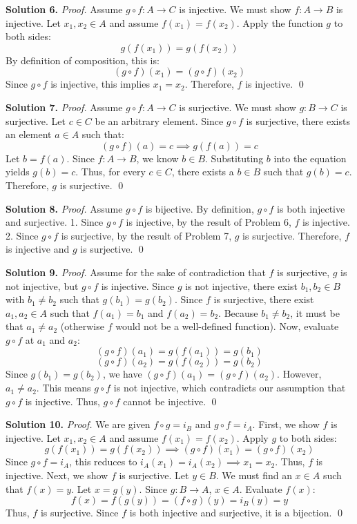 \documentclass[11pt, letterpaper]{article}
\theoremstyle{definition}
\theoremstyle{remark}
\begin{document}
\textbf{Solution 6.}
\textit{Proof.} Assume $g \circ f: A \to C$ is injective. We must show $f: A \to B$ is injective. Let $x_1, x_2 \in A$ and assume $f(x_1) = f(x_2)$. 
Apply the function $g$ to both sides:
\[
g(f(x_1)) = g(f(x_2))
\]
By definition of composition, this is:
\[
(g \circ f)(x_1) = (g \circ f)(x_2)
\]
Since $g \circ f$ is injective, this implies $x_1 = x_2$. Therefore, $f$ is injective.
\qed

\textbf{Solution 7.}
\textit{Proof.} Assume $g \circ f: A \to C$ is surjective. We must show $g: B \to C$ is surjective. Let $c \in C$ be an arbitrary element. 
Since $g \circ f$ is surjective, there exists an element $a \in A$ such that:
\[
(g \circ f)(a) = c \implies g(f(a)) = c
\]
Let $b = f(a)$. Since $f: A \to B$, we know $b \in B$. Substituting $b$ into the equation yields $g(b) = c$. 
Thus, for every $c \in C$, there exists a $b \in B$ such that $g(b) = c$. Therefore, $g$ is surjective.
\qed

\textbf{Solution 8.}
\textit{Proof.} Assume $g \circ f$ is bijective. By definition, $g \circ f$ is both injective and surjective.
1. Since $g \circ f$ is injective, by the result of Problem 6, $f$ is injective.
2. Since $g \circ f$ is surjective, by the result of Problem 7, $g$ is surjective.
Therefore, $f$ is injective and $g$ is surjective.
\qed

\textbf{Solution 9.}
\textit{Proof.} Assume for the sake of contradiction that $f$ is surjective, $g$ is not injective, but $g \circ f$ is injective.
Since $g$ is not injective, there exist $b_1, b_2 \in B$ with $b_1 \neq b_2$ such that $g(b_1) = g(b_2)$.
Since $f$ is surjective, there exist $a_1, a_2 \in A$ such that $f(a_1) = b_1$ and $f(a_2) = b_2$. 
Because $b_1 \neq b_2$, it must be that $a_1 \neq a_2$ (otherwise $f$ would not be a well-defined function).
Now, evaluate $g \circ f$ at $a_1$ and $a_2$:
\[
(g \circ f)(a_1) = g(f(a_1)) = g(b_1)
\]
\[
(g \circ f)(a_2) = g(f(a_2)) = g(b_2)
\]
Since $g(b_1) = g(b_2)$, we have $(g \circ f)(a_1) = (g \circ f)(a_2)$. 
However, $a_1 \neq a_2$. This means $g \circ f$ is not injective, which contradicts our assumption that $g \circ f$ is injective. Thus, $g \circ f$ cannot be injective.
\qed

\textbf{Solution 10.}
\textit{Proof.} We are given $f \circ g = i_B$ and $g \circ f = i_A$.
First, we show $f$ is injective. Let $x_1, x_2 \in A$ and assume $f(x_1) = f(x_2)$. Apply $g$ to both sides:
\[
g(f(x_1)) = g(f(x_2)) \implies (g \circ f)(x_1) = (g \circ f)(x_2)
\]
Since $g \circ f = i_A$, this reduces to $i_A(x_1) = i_A(x_2) \implies x_1 = x_2$. Thus, $f$ is injective.
Next, we show $f$ is surjective. Let $y \in B$. We must find an $x \in A$ such that $f(x) = y$. Let $x = g(y)$. Since $g: B \to A$, $x \in A$. Evaluate $f(x)$:
\[
f(x) = f(g(y)) = (f \circ g)(y) = i_B(y) = y
\]
Thus, $f$ is surjective. Since $f$ is both injective and surjective, it is a bijection.
\qed
\end{document}
